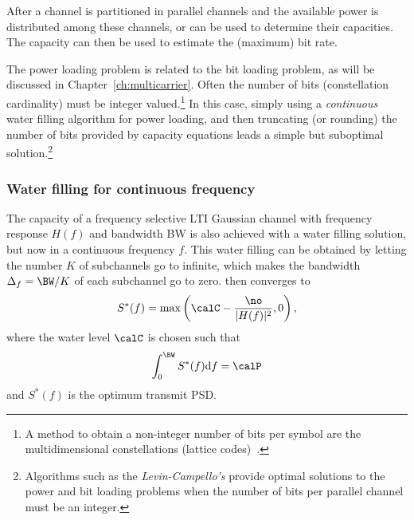 After a channel is partitioned in parallel channels and
the available power is distributed among these channels,  or  can be used to determine their capacities. The capacity
can then be used to estimate the (maximum) bit rate.

The power loading problem is related to the bit loading problem, as will be discussed in Chapter~\ref{ch:multicarrier}. 
Often the number of bits (constellation cardinality) must be integer valued.\footnote{A method to obtain a non-integer number of bits per symbol are the multidimensional constellations (lattice codes)~\cite{Forney89}.} In this case, simply using a \emph{continuous} water filling algorithm for power loading, and then truncating (or rounding) the number of bits provided by capacity equations leads a simple but suboptimal solution.\footnote{Algorithms such as the \emph{Levin-Campello's} provide optimal solutions to the power and bit loading problems when the number of bits per parallel channel must be an integer.}





\subsubsection{Water filling for continuous frequency}

The capacity of a frequency selective LTI Gaussian channel with frequency response $H(f)$ and bandwidth BW is also achieved with a water filling solution, but now in a continuous frequency $f$. This water filling can be obtained by letting the number $K$ of subchannels go to infinite, which makes the bandwidth $\Delta_f = \BW/K$ of each subchannel go to zero.  then converges to
\begin{equation}
S^*(f) = \max \left(\calC - \frac{\no}{|H(f)|^2}, 0 \right),
\label{eq:waterfillingContinuosSolution}
\end{equation}
where the water level $\calC$ is chosen such that
\begin{equation}
\int_{0}^{\BW} S^*(f) \textrm{d}f = \calP
\label{eq:waterfillingContinuosSolutionConstrain}
\end{equation}
and $S^*(f)$ is the optimum transmit PSD.

